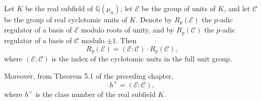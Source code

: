 Let $K$ be the real subfield of $\mathbb{Q}(\mu_n)$, let $\mathcal{E}$ be the group of units of $K$, and let $\mathcal{C}$ be the group of real cyclotomic units of $K$. Denote by $R_p(\mathcal{E})$ the $p$-adic regulator of a basis of $\mathcal{E}$ modulo roots of unity, and by $R_p(\mathcal{C})$ the $p$-adic regulator of a basis of $\mathcal{C}$ modulo $\pm 1$. Then
$$
R_p(\mathcal{E}) = (\mathcal{E} : \mathcal{C}) \cdot R_p(\mathcal{C}),
$$
where $(\mathcal{E} : \mathcal{C})$ is the index of the cyclotomic units in the full unit group.

Moreover, from Theorem 5.1 of the preceding chapter,
$$
h^+ = (\mathcal{E} : \mathcal{C}),
$$
where $h^+$ is the class number of the real subfield $K$.
